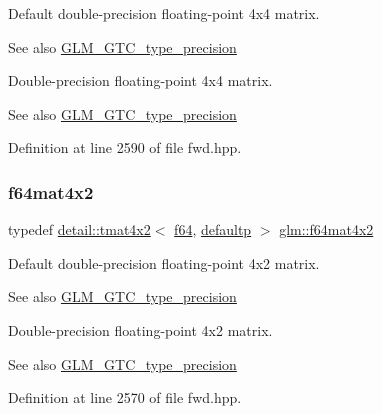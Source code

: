 Default double-\/precision floating-\/point 4x4 matrix. \begin{DoxySeeAlso}{See also}
\hyperlink{group__gtc__type__precision}{G\+L\+M\+\_\+\+G\+T\+C\+\_\+type\+\_\+precision}
\end{DoxySeeAlso}
Double-\/precision floating-\/point 4x4 matrix. \begin{DoxySeeAlso}{See also}
\hyperlink{group__gtc__type__precision}{G\+L\+M\+\_\+\+G\+T\+C\+\_\+type\+\_\+precision} 
\end{DoxySeeAlso}


Definition at line 2590 of file fwd.\+hpp.

\mbox{\label{group__gtc__type__precision_gae716a8717cc6af191aec562d93ff6299}} 
\subsubsection{\texorpdfstring{f64mat4x2}{f64mat4x2}}
{\footnotesize\ttfamily typedef \hyperlink{structglm_1_1detail_1_1tmat4x2}{detail\+::tmat4x2}$<$ \hyperlink{group__gtc__type__precision_ga2bba392e555124b36cde6abba349bab3}{f64}, \hyperlink{namespaceglm_a0f04f086094c747d227af4425893f545a9d21ccd8b5a009ec7eb7677befc3bf51}{defaultp} $>$ \hyperlink{group__gtc__type__precision_gae716a8717cc6af191aec562d93ff6299}{glm\+::f64mat4x2}}

Default double-\/precision floating-\/point 4x2 matrix. \begin{DoxySeeAlso}{See also}
\hyperlink{group__gtc__type__precision}{G\+L\+M\+\_\+\+G\+T\+C\+\_\+type\+\_\+precision}
\end{DoxySeeAlso}
Double-\/precision floating-\/point 4x2 matrix. \begin{DoxySeeAlso}{See also}
\hyperlink{group__gtc__type__precision}{G\+L\+M\+\_\+\+G\+T\+C\+\_\+type\+\_\+precision} 
\end{DoxySeeAlso}


Definition at line 2570 of file fwd.\+hpp.

\mbox{\label{group__gtc__type__precision_gaca283f88500d9895afb939516e7372d1}} 
